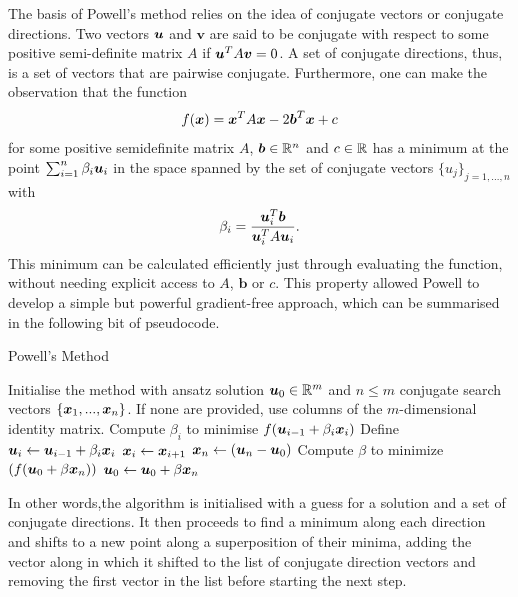 The basis of Powell's method relies on the idea of conjugate vectors or conjugate directions. Two vectors $\boldsymbol{u}$ and $\boldsymbol{v}$ are said to be conjugate with respect to some positive semi-definite matrix $A$ if $\boldsymbol{u}^T A \boldsymbol{v} = 0$. A set of conjugate directions, thus, is a set of vectors that are pairwise conjugate. Furthermore, one can make the observation \cite{brent_algorithms_2002} that the function
\begin{equation}
    f(\boldsymbol{x}) = \boldsymbol{x}^T A \boldsymbol{x} - 2\boldsymbol{b}^T \boldsymbol{x} + c
\end{equation}
for some positive semidefinite matrix $A$, $\boldsymbol{b} \in \mathbb{R}^n$ and $c \in \mathbb{R}$ has a minimum at the point $\sum_{i=1}^n \beta_i \boldsymbol{u}_i$ in the space spanned by the set of conjugate vectors $\{ u_j \}_{j = 1,...,n}$ with
\begin{equation}
    \beta_i = \frac{\boldsymbol{u}_i^T\boldsymbol{b}}{\boldsymbol{u}_i^T A \boldsymbol{u}_i}.
\end{equation}
This minimum can be calculated efficiently just through evaluating the function, without needing explicit access to $A$, $\boldsymbol{b}$ or $c$. This property allowed Powell to develop a simple but powerful gradient-free approach, which can be summarised in the following bit of pseudocode.
\begin{algorithm}
\caption{Powell's Method}
\begin{algorithmic}[1]
\State Initialise the method with ansatz solution $\boldsymbol{u}_0 \in \mathbb{R}^m$ and $n \leq m$ conjugate search vectors $\{\boldsymbol{x}_1, ..., \boldsymbol{x}_n \}$. If none are provided, use columns of the $m$-dimensional identity matrix.
\State Compute $\beta_i$ to minimise $f(\boldsymbol{u}_{i - 1} + \beta_i \boldsymbol{x}_i)$
\State Define $\boldsymbol{u}_i \gets \boldsymbol{u}_{i - 1} + \beta_i \boldsymbol{x}_i$
\EndFor
{}
\State $\boldsymbol{x}_{i} \gets \boldsymbol{x}_{i+1}$
\EndFor
\State $\boldsymbol{x}_n \gets (\boldsymbol{u}_n - \boldsymbol{u}_0)$
\State Compute $\beta$ to minimize $(f(\boldsymbol{u}_0  + \beta \boldsymbol{x}_n))$
\State $\boldsymbol{u}_0 \gets \boldsymbol{u}_0 + \beta \boldsymbol{x}_n$
\EndProcedure
\end{algorithmic}
\end{algorithm}

In other words,the algorithm is initialised with a guess for a solution and a set of conjugate directions. It then proceeds to find a minimum along each direction and shifts to a new point along a superposition of their minima, adding the vector along in which it shifted to the list of conjugate direction vectors and removing the first vector in the list before starting the next step.

